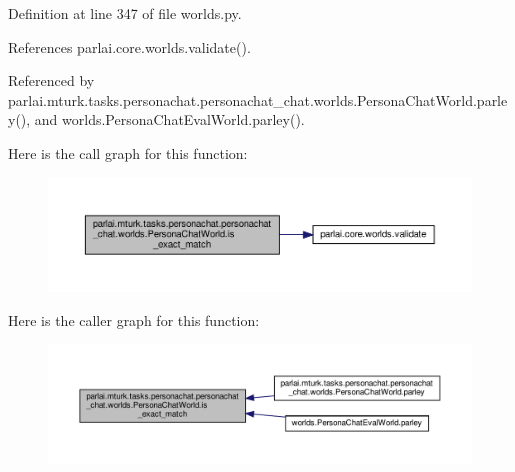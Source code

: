 Definition at line 347 of file worlds.\+py.



References parlai.\+core.\+worlds.\+validate().



Referenced by parlai.\+mturk.\+tasks.\+personachat.\+personachat\+\_\+chat.\+worlds.\+Persona\+Chat\+World.\+parley(), and worlds.\+Persona\+Chat\+Eval\+World.\+parley().

Here is the call graph for this function\+:
\nopagebreak
\begin{figure}[H]
\begin{center}
\leavevmode
\includegraphics[width=350pt]{classparlai_1_1mturk_1_1tasks_1_1personachat_1_1personachat__chat_1_1worlds_1_1PersonaChatWorld_a5edf0526e8aad41c00289548253d51e9_cgraph}
\end{center}
\end{figure}
Here is the caller graph for this function\+:
\nopagebreak
\begin{figure}[H]
\begin{center}
\leavevmode
\includegraphics[width=350pt]{classparlai_1_1mturk_1_1tasks_1_1personachat_1_1personachat__chat_1_1worlds_1_1PersonaChatWorld_a5edf0526e8aad41c00289548253d51e9_icgraph}
\end{center}
\end{figure}
\mbox{\label{classparlai_1_1mturk_1_1tasks_1_1personachat_1_1personachat__chat_1_1worlds_1_1PersonaChatWorld_a7f6c59f2e1f897e1e480b43fc67680df}} 
